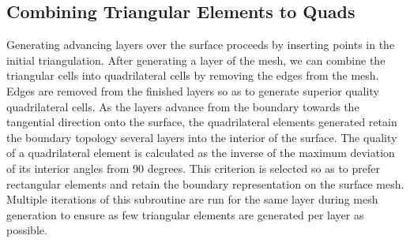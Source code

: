\documentclass[conf]{new-aiaa}
\begin{document}
\subsection{Combining Triangular Elements to Quads}

Generating advancing layers over the surface proceeds by inserting points in the initial triangulation. After generating a layer of the mesh, we can combine the triangular cells into quadrilateral cells by removing the edges from the mesh. Edges are removed from the finished layers so as to generate superior quality quadrilateral cells. As the layers advance from the boundary towards the tangential direction onto the surface, the quadrilateral elements generated retain the boundary topology several layers into the interior of the surface. The quality of a quadrilateral element is calculated as the inverse of the maximum deviation of its interior angles from 90 degrees. This criterion is selected so as to prefer rectangular elements and retain the boundary representation on the surface mesh. Multiple iterations of this subroutine are run for the same layer during mesh generation to ensure as few triangular elements are generated per layer as possible.
\end{document}

